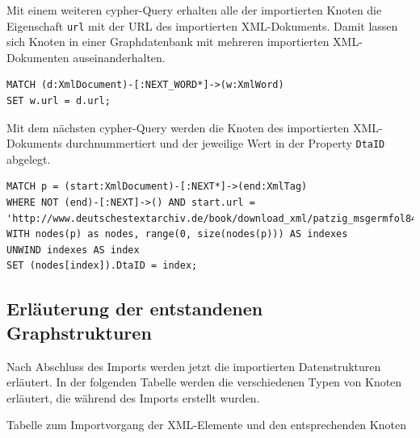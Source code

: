 \documentclass[12pt,ngerman,]{article}
\begin{document}
Mit einem weiteren cypher-Query erhalten alle der importierten Knoten
die Eigenschaft \texttt{url} mit der URL des importierten XML-Dokuments.
Damit lassen sich Knoten in einer Graphdatenbank mit mehreren
importierten XML-Dokumenten auseinanderhalten.

\begin{verbatim}
MATCH (d:XmlDocument)-[:NEXT_WORD*]->(w:XmlWord)
SET w.url = d.url;
\end{verbatim}

Mit dem nächsten cypher-Query werden die Knoten des importierten
XML-Dokuments durchnummertiert und der jeweilige Wert in der Property
\texttt{DtaID} abgelegt.

\begin{verbatim}
MATCH p = (start:XmlDocument)-[:NEXT*]->(end:XmlTag)
WHERE NOT (end)-[:NEXT]->() AND start.url = 'http://www.deutschestextarchiv.de/book/download_xml/patzig_msgermfol841842_1828'
WITH nodes(p) as nodes, range(0, size(nodes(p))) AS indexes
UNWIND indexes AS index
SET (nodes[index]).DtaID = index;
\end{verbatim}

\subsection{Erläuterung der entstandenen
Graphstrukturen}\label{erluxe4uterung-der-entstandenen-graphstrukturen}

Nach Abschluss des Imports werden jetzt die importierten Datenstrukturen
erläutert. In der folgenden Tabelle werden die verschiedenen Typen von
Knoten erläutert, die während des Imports erstellt wurden.

Tabelle zum Importvorgang der XML-Elemente und den entsprechenden Knoten
\end{document}
